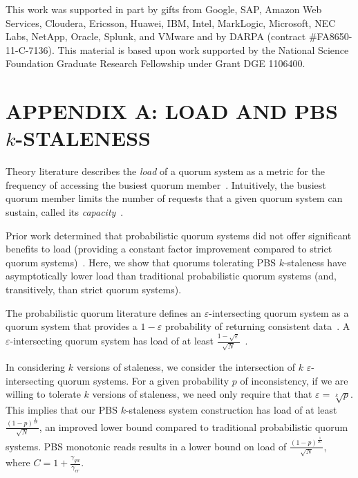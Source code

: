 \documentclass{vldb}
\newcommand{\sectionskip}{-0em}
\begin{document}
This work was supported in part by gifts from Google, SAP,
Amazon Web Services, Cloudera, Ericsson, Huawei, IBM, Intel,
MarkLogic, Microsoft, NEC Labs, NetApp, Oracle, Splunk, and VMware and
by DARPA (contract \#FA8650-11-C-7136).  This material is based upon
work supported by the National Science Foundation Graduate Research
Fellowship under Grant DGE 1106400.

{\small


}

\balance


\vspace{\sectionskip}
\section*{APPENDIX A: LOAD AND PBS {\large$k$}-STALENESS}
Theory literature describes the \textit{load} of a quorum system as a
metric for the frequency of accessing the busiest quorum
member~\cite[Definition 3.2]{quorumsystems}.  Intuitively, the busiest
quorum member limits the number of requests that a given quorum system
can sustain, called its \textit{capacity}~\cite[Corollary
  3.9]{quorumsystems}.

Prior work determined that probabilistic quorum systems did not offer
significant benefits to load (providing a constant factor improvement
compared to strict quorum systems)~\cite{prob-quorum}.  Here, we show
that quorums tolerating PBS $k$-staleness have asymptotically lower
load than traditional probabilistic quorum systems (and, transitively,
than strict quorum systems).

The probabilistic quorum literature defines an
$\varepsilon$-intersecting quorum system as a quorum system that
provides a $1-\varepsilon$ probability of returning consistent
data~\cite[Definition 3.1]{prob-quorum}.  A $\varepsilon$-intersecting
quorum system has load of at least 
$\frac{1-\sqrt{\varepsilon}}{\sqrt{N}}$~\cite[Corollary
  3.12]{prob-quorum}.

In considering $k$ versions of staleness, we consider the intersection
of $k$ $\varepsilon$-intersecting quorum systems.  For a given
probability $p$ of inconsistency, if we are willing to tolerate $k$
versions of staleness, we need only require that that $\varepsilon =
\sqrt[k]{p}$.  This implies that our PBS $k$-staleness system
construction has load of at least
$\frac{(1-p)^{\frac{1}{2k}}}{\sqrt{N}}$, an improved lower bound
compared to traditional probabilistic quorum systems.  PBS monotonic
reads results in a lower bound on load of
$\frac{(1-p)^{\frac{1}{2C}}}{\sqrt{N}}$, where
$C=1+\frac{\gamma_{gw}}{\gamma_{cr}}$.
\end{document}
